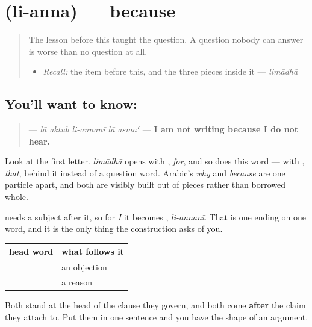 \section[\texorpdfstring{\ar{لأن} (li-anna)}{لأن (li-anna)}]{ (li-anna) — because}

\label{lesson:AR-C40-lianna}



\begin{quote}
The lesson before this taught the question. A question nobody can answer is worse than no question at all.

\begin{itemize}
\raggedright
  \item \emph{Recall:} the item before this, and the three pieces inside it — \emph{limādhā}
\end{itemize}
\end{quote}

\subsection*{You'll want to know: }
\begin{quote}
\textbf{    } — \emph{lā aktub li-annanī lā asmaʿ} — \textbf{I am not writing because I do not hear.}
\end{quote}

Look at the first letter. \emph{limādhā} opens with \textbf{}, \emph{for}, and so does this word — with \textbf{}, \emph{that}, behind it instead of a question word. Arabic's \emph{why} and \emph{because} are one particle apart, and both are visibly built out of pieces rather than borrowed whole.

\textbf{} needs a subject after it, so for \emph{I} it becomes \textbf{}, \emph{li-annanī}. That is one ending on one word, and it is the only thing the construction asks of you.

\begin{grammarlens}[title={Grammar Lens: the claim, then the reason}]
\noindent
\begin{tabularx}{\linewidth}{@{}>{\raggedright\arraybackslash}X>{\raggedright\arraybackslash}X@{}}
\toprule
\textbf{head word} & \textbf{what follows it} \\
\midrule
\textbf{\ar{لكن}} & an objection \\
\textbf{\ar{لأن}} & a reason \\
\bottomrule
\end{tabularx}

Both stand at the head of the clause they govern, and both come \textbf{after} the claim they attach to. Put them in one sentence and you have the shape of an argument.
\end{grammarlens}

